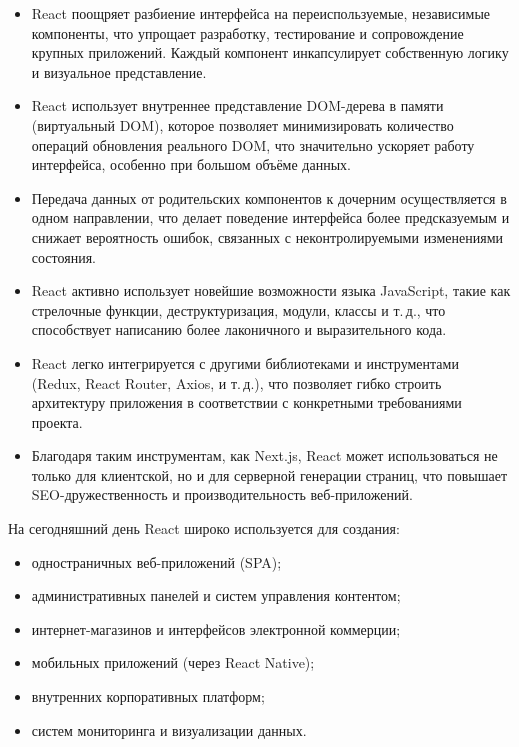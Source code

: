\documentclass[diploma]{SCWorks}
\begin{document}
\begin{itemize}
    \item React поощряет разбиение интерфейса на переиспользуемые, независимые 
    компоненты, что упрощает разработку, тестирование и сопровождение крупных 
    приложений. Каждый компонент инкапсулирует собственную логику и визуальное 
    представление.
    \item React использует внутреннее представление DOM-дерева в памяти 
    (виртуальный DOM), которое позволяет минимизировать количество операций 
    обновления реального DOM, что значительно ускоряет работу интерфейса, 
    особенно при большом объёме данных.
    \item Передача данных от родительских компонентов к дочерним 
    осуществляется в одном направлении, что делает поведение интерфейса 
    более предсказуемым и снижает вероятность ошибок, связанных с 
    неконтролируемыми изменениями состояния.
    \item React активно использует новейшие возможности языка JavaScript, 
    такие как стрелочные функции, деструктуризация, модули, классы и т.\,д., 
    что способствует написанию более лаконичного и выразительного кода.
    \item React легко интегрируется с другими библиотеками и инструментами 
    (Redux, React Router, Axios, и т.\,д.), что позволяет гибко строить 
    архитектуру приложения в соответствии с конкретными требованиями проекта.
    \item Благодаря таким инструментам, как Next.js, React может 
    использоваться не только для клиентской, но и для серверной генерации 
    страниц, что повышает SEO-дружественность и производительность 
    веб-приложений.
\end{itemize}

На сегодняшний день React широко используется для создания:

\begin{itemize}
    \item одностраничных веб-приложений (SPA);
    \item административных панелей и систем управления контентом;
    \item интернет-магазинов и интерфейсов электронной коммерции;
    \item мобильных приложений (через React Native);
    \item внутренних корпоративных платформ;
    \item систем мониторинга и визуализации данных.
\end{itemize}
\end{document}
